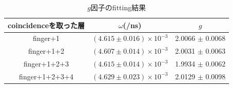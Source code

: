 \begin{table}[H]
\caption{$g$因子のfitting結果}
\label{fit_g}
\begin{center}
\begin{tabular}{ccc}\toprule
coincidenceを取った層 	& $\omega$(/ns) 			& $g$ \\ \midrule
finger+1 		& $( 4.615 \pm 0.016 ) \times 10^{-3}$ 	& 2.0066 $\pm$ 0.0068 \\
finger+1+2 		& $( 4.607 \pm 0.014 ) \times 10^{-3}$ 	& 2.0031 $\pm$ 0.0063 \\
finger+1+2+3 		& $( 4.615 \pm 0.014 ) \times 10^{-3}$ 	& 1.9934 $\pm$ 0.0062 \\
finger+1+2+3+4 		& $( 4.629 \pm 0.023 ) \times 10^{-3}$ 	& 2.0129 $\pm$ 0.0098 \\ \bottomrule
\end{tabular}
\end{center}
\end{table}%


